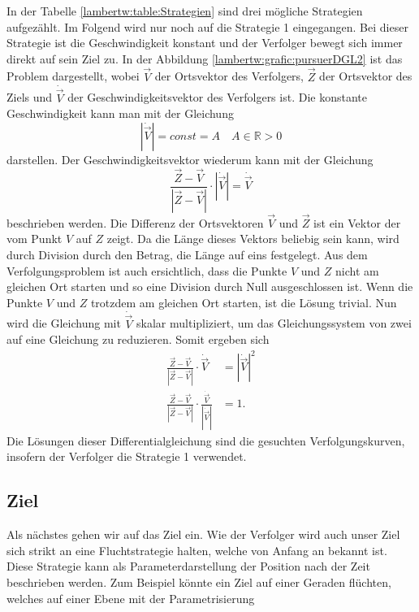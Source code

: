 In der Tabelle \eqref{lambertw:table:Strategien} sind drei mögliche Strategien aufgezählt.
Im Folgend wird nur noch auf die Strategie 1 eingegangen.
Bei dieser Strategie ist die Geschwindigkeit konstant und der Verfolger bewegt sich immer direkt auf sein Ziel zu.
In der Abbildung \eqref{lambertw:grafic:pursuerDGL2} ist das Problem dargestellt,
wobei $\vec{V}$ der Ortsvektor des Verfolgers, $\vec{Z}$ der Ortsvektor des Ziels und $\dot{\vec{V}}$ der Geschwindigkeitsvektor des Verfolgers ist.
Die konstante Geschwindigkeit kann man mit der Gleichung
\begin{equation}
    |\dot{\vec{V}}|
    = const = A
    \quad A\in\mathbb{R}>0
\end{equation}
darstellen. Der Geschwindigkeitsvektor wiederum kann mit der Gleichung
\begin{equation}
    \frac{\vec{Z}-\vec{V}}{|\vec{Z}-\vec{V}|}\cdot|\dot{\vec{V}}|
    =
    \dot{\vec{V}}
\end{equation}
beschrieben werden.
Die Differenz der Ortsvektoren $\vec{V}$ und $\vec{Z}$ ist ein Vektor der vom Punkt $V$ auf $Z$ zeigt.
Da die Länge dieses Vektors beliebig sein kann, wird durch Division durch den Betrag, die Länge auf eins festgelegt.
Aus dem Verfolgungsproblem ist auch ersichtlich, dass die Punkte $V$ und $Z$ nicht am gleichen Ort starten und so eine Division durch Null ausgeschlossen ist.
Wenn die Punkte $V$ und $Z$ trotzdem am gleichen Ort starten, ist die Lösung trivial.
Nun wird die Gleichung mit $\dot{\vec{V}}$ skalar multipliziert, um das Gleichungssystem von zwei auf eine Gleichung zu reduzieren. Somit ergeben sich
\begin{align}
    \label{lambertw:pursuerDGL}
    \frac{\vec{Z}-\vec{V}}{|\vec{Z}-\vec{V}|}\cdot
    \dot{\vec{V}}
    &=
    |\dot{\vec{V}}|^2
    \\
    \frac{\vec{Z}-\vec{V}}{|\vec{Z}-\vec{V}|}\cdot \frac{\dot{\vec{V}}}{|\dot{\vec{V}}|}
    &=
    1 \text{.}
\end{align}
Die Lösungen dieser Differentialgleichung sind die gesuchten Verfolgungskurven, insofern der Verfolger die Strategie 1 verwendet.

\subsection{Ziel
\label{lambertw:subsection:Ziel}}
Als nächstes gehen wir auf das Ziel ein.
Wie der Verfolger wird auch unser Ziel sich strikt an eine Fluchtstrategie halten, welche von Anfang an bekannt ist.
Diese Strategie kann als Parameterdarstellung der Position nach der Zeit beschrieben werden.
Zum Beispiel könnte ein Ziel auf einer Geraden flüchten, welches auf einer Ebene mit der Parametrisierung

